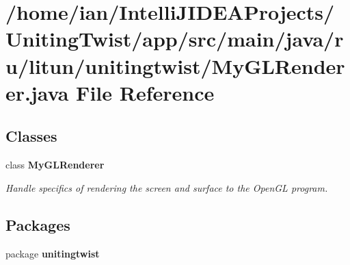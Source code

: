 \section{/home/ian/\+Intelli\+J\+I\+D\+E\+A\+Projects/\+Uniting\+Twist/app/src/main/java/ru/litun/unitingtwist/\+My\+G\+L\+Renderer.java File Reference}
\label{_my_g_l_renderer_8java}
\subsection*{Classes}
\begin{DoxyCompactItemize}
\item 
class \textbf{ My\+G\+L\+Renderer}
\begin{DoxyCompactList}\small\item\em Handle specifics of rendering the screen and surface to the Open\+GL program. \end{DoxyCompactList}\end{DoxyCompactItemize}
\subsection*{Packages}
\begin{DoxyCompactItemize}
\item 
package \textbf{ unitingtwist}
\end{DoxyCompactItemize}
